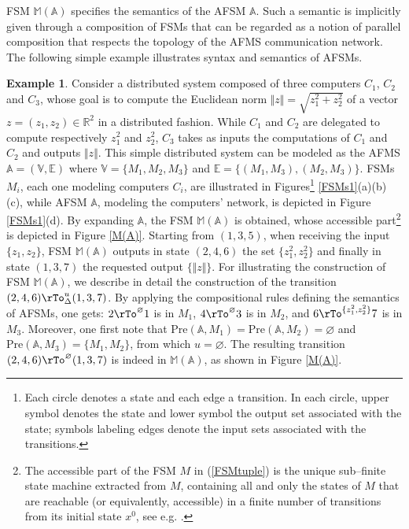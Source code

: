 \documentclass{amsart}
\theoremstyle{definition}
\newtheorem{example}[theorem]{Example}
\theoremstyle{remark}
\numberwithin{equation}{section}
\newcommand{\Pre}{\mathrm{Pre}}
\begin{document}
FSM $\mathbb{M}(\mathbb{A})$ specifies the semantics of the AFSM $\mathbb{A}$. Such a semantic is implicitly given through a composition of FSMs that can be regarded as a notion of parallel composition \cite{ModelChecking} that respects the topology of the AFMS communication network. 
The following simple example illustrates syntax and semantics of AFSMs.
\begin{example}
\label{exex}
Consider a distributed system composed of three computers $C_{1}$, $C_{2}$ and $C_{3}$, whose goal is to compute the Euclidean norm $\Vert z \Vert = \sqrt{z_{1}^{2}+z_{2}^{2}}$ of a vector $z=(z_{1},z_{2})\in \mathbb{R}^{2}$ in a distributed fashion. 
While $C_{1}$ and $C_{2}$ are delegated to compute respectively $z_{1}^{2}$ and $z_{2}^{2}$, $C_{3}$ takes as inputs the computations of $C_{1}$ and $C_{2}$ and outputs $\Vert z \Vert$. 
This simple distributed system can be modeled as the AFMS $\mathbb{A}=(\mathbb{V},\mathbb{E})$ where $\mathbb{V}=\{M_{1},M_{2},M_{3}\}$ and 
$\mathbb{E}=\{(M_{1},M_{3}),(M_{2},M_{3})\}$. 
FSMs $M_{i}$, each one modeling computers $C_{i}$, are illustrated in Figures\footnote{Each circle denotes a state and each edge a transition. In each circle, upper symbol denotes the state and lower symbol the output set associated with the state; symbols labeling edges denote the input sets associated with the transitions.} \ref{FSMs1}(a)(b)(c), while AFSM $\mathbb{A}$, modeling the computers' network, is depicted in Figure \ref{FSMs1}(d). 
By expanding $\mathbb{A}$, the FSM $\mathbb{M}(\mathbb{A})$ is obtained, whose accessible part\footnote{The accessible part of the FSM $M$ in (\ref{FSMtuple}) is the unique sub--finite state machine extracted from $M$, containing all and only the states of $M$ that are reachable (or equivalently, accessible) in a finite number of transitions from its initial state $x^{0}$, see e.g. \cite{cassandras}.} 
is depicted in Figure \ref{M(A)}. Starting from $(1,3,5)$, when receiving the input $\{z_{1},z_{2}\}$, FSM $\mathbb{M}(\mathbb{A})$ outputs in state $(2,4,6)$ the set $\{z_{1}^{2},z_{2}^{2}\}$ and finally in state $(1,3,7)$ the requested output $\{\Vert z \Vert\}$. For illustrating the construction of FSM $\mathbb{M}(\mathbb{A})$, we describe in detail the construction of the transition $(2,4,6) \rTo_{\Delta}^{u} (1,3,7)$. By applying the compositional rules defining the semantics of AFSMs, one gets: 
$2 \rTo^{\varnothing} 1$ is in $M_{1}$, $4 \rTo^{\varnothing} 3$ is in $M_{2}$, and $6 \rTo^{\{z_{1}^{2},z_{2}^{2}\}} 7$ is in $M_{3}$. Moreover, one first note that $\Pre(\mathbb{A},M_{1})=\Pre(\mathbb{A},M_{2})=\varnothing$ and $\Pre(\mathbb{A},M_{3})=\{M_{1},M_{2}\}$, from which $u=\varnothing$. 
The resulting transition $(2,4,6) \rTo^{\varnothing} (1,3,7)$ is indeed in $\mathbb{M}(\mathbb{A})$, as shown in Figure \ref{M(A)}. 
\end{example}
\end{document}
